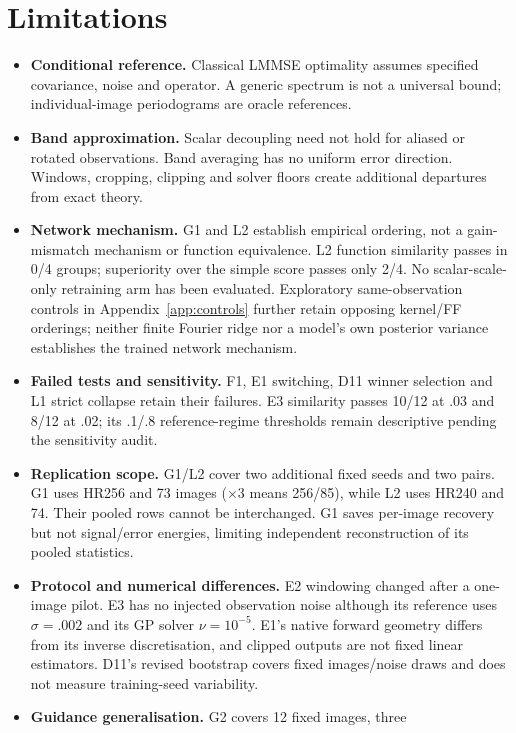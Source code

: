 \section{Limitations}\label{sec:limits}
\begin{itemize}
\item \textbf{Conditional reference.} Classical LMMSE optimality assumes
specified covariance, noise and operator. A generic spectrum is not a
universal bound; individual-image periodograms are oracle references.
\item \textbf{Band approximation.} Scalar decoupling need not hold for
aliased or rotated observations. Band averaging has no uniform error
direction. Windows, cropping, clipping and solver floors create additional
departures from exact theory.
\item \textbf{Network mechanism.} G1 and L2 establish empirical ordering,
not a gain-mismatch mechanism or function equivalence. L2 function
similarity passes in 0/4 groups; superiority over the simple score passes only
2/4. No scalar-scale-only retraining arm has been evaluated. Exploratory
same-observation controls in Appendix~\ref{app:controls} further retain
opposing kernel/FF orderings; neither finite Fourier ridge nor a model's
own posterior variance establishes the trained network mechanism.
\item \textbf{Failed tests and sensitivity.} F1, E1 switching, D11 winner
selection and L1 strict collapse retain their failures. E3 similarity
passes 10/12 at .03 and 8/12 at .02; its .1/.8 reference-regime thresholds
remain descriptive pending the sensitivity audit.
\item \textbf{Replication scope.} G1/L2 cover two additional fixed seeds
and two pairs. G1 uses HR256 and 73 images ($\times3$ means 256/85), while
L2 uses HR240 and 74. Their pooled rows cannot be interchanged. G1 saves
per-image recovery but not signal/error energies, limiting independent
reconstruction of its pooled statistics.
\item \textbf{Protocol and numerical differences.} E2 windowing changed
after a one-image pilot. E3 has no injected observation noise although its
reference uses $\sigma=.002$ and its GP solver $\nu=10^{-5}$. E1's native
forward geometry differs from its inverse discretisation, and clipped
outputs are not fixed linear estimators. D11's revised bootstrap covers
fixed images/noise draws and does not measure training-seed variability.
\item \textbf{Guidance generalisation.} G2 covers 12 fixed images, three

\end{itemize}
